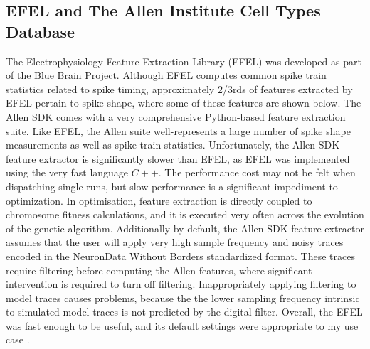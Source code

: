 

\subsection{EFEL and The Allen Institute Cell Types Database}
The Electrophysiology Feature Extraction Library (EFEL) \citep{EFEL} was developed as part of the Blue Brain Project. Although EFEL computes common spike train statistics related to spike timing, approximately 2/3rds of features extracted by EFEL pertain to spike shape, where some of these features are shown below. 
The Allen SDK comes with a very comprehensive Python-based feature extraction suite. Like EFEL, the Allen suite well-represents a large number of spike shape measurements as well as spike train statistics. 
Unfortunately, the Allen SDK feature extractor is significantly slower than EFEL, as EFEL was implemented using the very fast language $C++$. The performance cost may not be felt when dispatching single runs, but slow performance is a significant impediment to optimization. 
In optimisation, feature extraction is directly coupled to chromosome fitness calculations, and it is executed very often across the evolution of the genetic algorithm. Additionally by default, the Allen SDK feature extractor assumes that the user will apply very high sample frequency and noisy traces encoded in the NeuronData Without Borders \citep{teeters2015neurodata} standardized format. 
These traces require filtering before computing the Allen features, where significant intervention is required to turn off filtering. 
Inappropriately applying filtering to model traces causes problems, because the the lower sampling frequency intrinsic to simulated model traces is not predicted by the digital filter. Overall, the EFEL was fast enough to be useful, and its default settings were appropriate to my use case \citep{garcia2014neo}.

